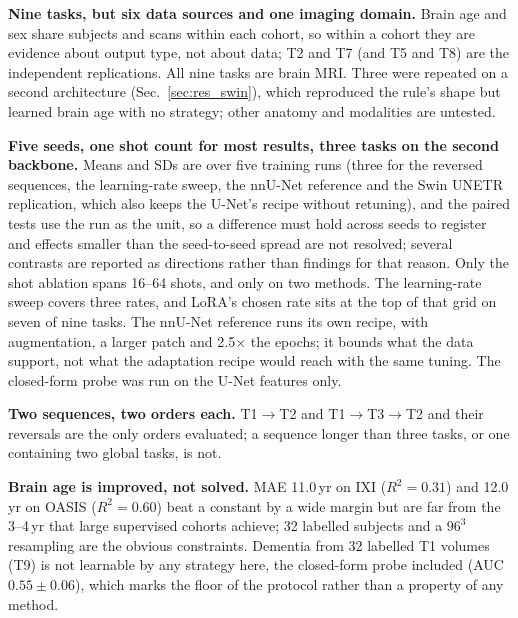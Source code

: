 \iffull\documentclass[journal]{IEEEtran}\else\documentclass[journal,twoside,web]{ieeecolor}\usepackage{generic}\fi
\begin{document}
\textbf{Nine tasks, but six data sources and one imaging domain.} Brain age and sex share subjects and scans within each cohort, so within a cohort they are evidence about output type, not about data; T2 and T7 (and T5 and T8) are the independent replications. All nine tasks are brain MRI. Three were repeated on a second architecture (Sec.~\ref{sec:res_swin}), which reproduced the rule's shape but learned brain age with no strategy; other anatomy and modalities are untested.

\textbf{Five seeds, one shot count for most results, three tasks on the second backbone.} Means and SDs are over five training runs (three for the reversed sequences, the learning-rate sweep, the nnU-Net reference and the Swin UNETR replication, which also keeps the U-Net's recipe without retuning), and the paired tests use the run as the unit, so a difference must hold across seeds to register and effects smaller than the seed-to-seed spread are not resolved; several contrasts are reported as directions rather than findings for that reason. Only the shot ablation spans 16--64 shots, and only on two methods. The learning-rate sweep covers three rates, and LoRA's chosen rate sits at the top of that grid on seven of nine tasks. The nnU-Net reference runs its own recipe, with augmentation, a larger patch and 2.5$\times$ the epochs; it bounds what the data support, not what the adaptation recipe would reach with the same tuning. The closed-form probe was run on the U-Net features only.


\textbf{Two sequences, two orders each.} T1$\to$T2 and T1$\to$T3$\to$T2 and their reversals are the only orders evaluated; a sequence longer than three tasks, or one containing two global tasks, is not.

\textbf{Brain age is improved, not solved.} MAE 11.0\,yr on IXI ($R^2=0.31$) and 12.0\,yr on OASIS ($R^2=0.60$) beat a constant by a wide margin but are far from the 3--4\,yr that large supervised cohorts achieve; 32 labelled subjects and a $96^3$ resampling are the obvious constraints. Dementia from 32 labelled T1 volumes (T9) is not learnable by any strategy here, the closed-form probe included (AUC $0.55\pm0.06$), which marks the floor of the protocol rather than a property of any method.
\end{document}
